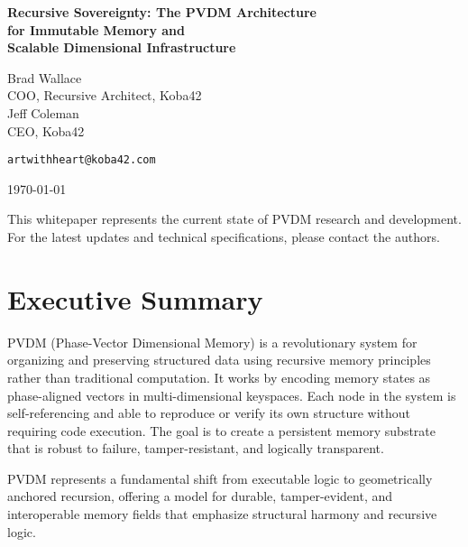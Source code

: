 \documentclass[12pt,a4paper]{article}
\begin{document}
\begin{titlepage}
\centering
\vspace*{2cm}

{\Huge\bfseries Recursive Sovereignty: The PVDM Architecture\\[0.5cm] for Immutable Memory and\\[0.5cm] Scalable Dimensional Infrastructure}

\vspace{2cm}

{\Large Brad Wallace}\\[0.3cm]
{\large COO, Recursive Architect, Koba42}\\[0.5cm]

{\Large Jeff Coleman}\\[0.3cm]
{\large CEO, Koba42}

\vspace{2cm}

{\large \texttt{artwithheart@koba42.com}}

\vspace{2cm}

{\large \today}

\vfill

{\small This whitepaper represents the current state of PVDM research and development.\\ For the latest updates and technical specifications, please contact the authors.}

\end{titlepage}

\tableofcontents
\newpage

\section{Executive Summary}

PVDM (Phase-Vector Dimensional Memory) is a revolutionary system for organizing and preserving structured data using recursive memory principles rather than traditional computation. It works by encoding memory states as phase-aligned vectors in multi-dimensional keyspaces. Each node in the system is self-referencing and able to reproduce or verify its own structure without requiring code execution. The goal is to create a persistent memory substrate that is robust to failure, tamper-resistant, and logically transparent.

PVDM represents a fundamental shift from executable logic to geometrically anchored recursion, offering a model for durable, tamper-evident, and interoperable memory fields that emphasize structural harmony and recursive logic.
\end{document}
